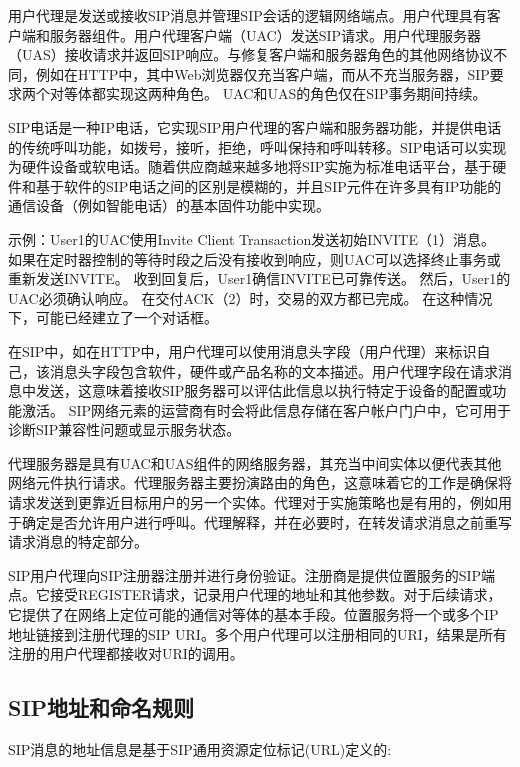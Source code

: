 \documentclass[a4paper,AutoFakeBold,oneside,12pt]{book}
\begin{document}
用户代理是发送或接收SIP消息并管理SIP会话的逻辑网络端点。用户代理具有客户端和服务器组件。用户代理客户端（UAC）发送SIP请求。用户代理服务器（UAS）接收请求并返回SIP响应。与修复客户端和服务器角色的其他网络协议不同，例如在HTTP中，其中Web浏览器仅充当客户端，而从不充当服务器，SIP要求两个对等体都实现这两种角色。 UAC和UAS的角色仅在SIP事务期间持续。

SIP电话是一种IP电话，它实现SIP用户代理的客户端和服务器功能，并提供电话的传统呼叫功能，如拨号，接听，拒绝，呼叫保持和呼叫转移。SIP电话可以实现为硬件设备或软电话。随着供应商越来越多地将SIP实施为标准电话平台，基于硬件和基于软件的SIP电话之间的区别是模糊的，并且SIP元件在许多具有IP功能的通信设备（例如智能电话）的基本固件功能中实现。


示例：User1的UAC使用Invite Client Transaction发送初始INVITE（1）消息。 如果在定时器控制的等待时段之后没有接收到响应，则UAC可以选择终止事务或重新发送INVITE。 收到回复后，User1确信INVITE已可靠传送。 然后，User1的UAC必须确认响应。 在交付ACK（2）时，交易的双方都已完成。 在这种情况下，可能已经建立了一个对话框。

在SIP中，如在HTTP中，用户代理可以使用消息头字段（用户代理）来标识自己，该消息头字段包含软件，硬件或产品名称的文本描述。用户代理字段在请求消息中发送，这意味着接收SIP服务器可以评估此信息以执行特定于设备的配置或功能激活。 SIP网络元素的运营商有时会将此信息存储在客户帐户门户中，它可用于诊断SIP兼容性问题或显示服务状态。

代理服务器是具有UAC和UAS组件的网络服务器，其充当中间实体以便代表其他网络元件执行请求。代理服务器主要扮演路由的角色，这意味着它的工作是确保将请求发送到更靠近目标用户的另一个实体。代理对于实施策略也是有用的，例如用于确定是否允许用户进行呼叫。代理解释，并在必要时，在转发请求消息之前重写请求消息的特定部分。

SIP用户代理向SIP注册器注册并进行身份验证。注册商是提供位置服务的SIP端点。它接受REGISTER请求，记录用户代理的地址和其他参数。对于后续请求，它提供了在网络上定位可能的通信对等体的基本手段。位置服务将一个或多个IP地址链接到注册代理的SIP URI。多个用户代理可以注册相同的URI，结果是所有注册的用户代理都接收对URI的调用。

\subsection{SIP地址和命名规则}
SIP消息的地址信息是基于SIP通用资源定位标记(URL)定义的:
\end{document}
